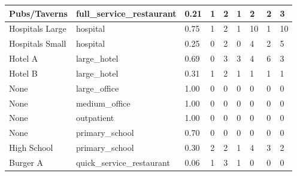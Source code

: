 \begin{table}[]
\begin{tabular}{|l|l|l|l|l|l|l|l|l|}
    Pubs/Taverns             & full\_service\_restaurant       & 0.21                               & 1                & 2              & 1                & 2             & 2              & 3                \\ \hline
    Hospitals Large          & hospital                        & 0.75                               & 1                & 2              & 1                & 10            & 1              & 10               \\ \hline
    Hospitals Small          & hospital                        & 0.25                               & 0                & 2              & 0                & 4             & 2              & 5                \\ \hline
    Hotel A                  & large\_hotel                    & 0.69                               & 0                & 3              & 3                & 4             & 6              & 3                \\ \hline
    Hotel B                  & large\_hotel                    & 0.31                               & 1                & 2              & 1                & 1             & 1              & 1                \\ \hline
    None                     & large\_office                   & 1.00                               & 0                & 0              & 0                & 0             & 0              & 0                \\ \hline
    None                     & medium\_office                  & 1.00                               & 0                & 0              & 0                & 0             & 0              & 0                \\ \hline
    None                     & outpatient                      & 1.00                               & 0                & 0              & 0                & 0             & 0              & 0                \\ \hline
    None                     & primary\_school                 & 0.70                               & 0                & 0              & 0                & 0             & 0              & 0                \\ \hline
    High School              & primary\_school                 & 0.30                               & 2                & 2              & 1                & 4             & 3              & 2                \\ \hline
    Burger A                 & quick\_service\_restaurant      & 0.06                               & 1                & 3              & 1                & 0             & 0              & 0                \\ \hline

\end{tabular}
\end{table}
